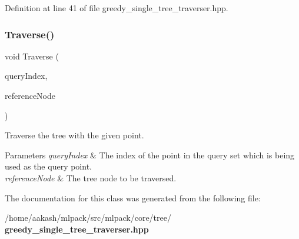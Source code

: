 Definition at line 41 of file greedy\+\_\+single\+\_\+tree\+\_\+traverser.\+hpp.

\mbox{\label{classmlpack_1_1tree_1_1GreedySingleTreeTraverser_a794b07d567369c4b56e958a21c27531b}} 
\subsubsection{Traverse()}
{\footnotesize\ttfamily void Traverse (\begin{DoxyParamCaption}\item[{const size\+\_\+t}]{query\+Index,  }\item[{Tree\+Type \&}]{reference\+Node }\end{DoxyParamCaption})}



Traverse the tree with the given point. 


\begin{DoxyParams}{Parameters}
{\em query\+Index} & The index of the point in the query set which is being used as the query point. \\
\hline
{\em reference\+Node} & The tree node to be traversed. \\
\hline
\end{DoxyParams}


The documentation for this class was generated from the following file\+:\begin{DoxyCompactItemize}
\item 
/home/aakash/mlpack/src/mlpack/core/tree/\textbf{ greedy\+\_\+single\+\_\+tree\+\_\+traverser.\+hpp}\end{DoxyCompactItemize}
